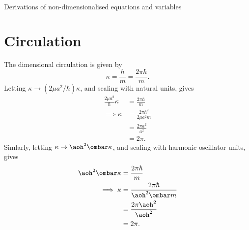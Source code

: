 \begin{chapter}{\label{cha:nondim}Derivations of non-dimensionalised equations
and variables}
  \section{Circulation}
  The dimensional circulation is given by
  \begin{equation*}
    \kappa = \frac{h}{m} = \frac{2\pi\hbar}{m}.
  \end{equation*}
  Letting $\kappa \to (2\mu a^{2}/\hbar)\kappa$, and scaling with natural
  units, gives
  \begin{equation*}
    \begin{aligned}
      \frac{2\mu a^{2}}{\hbar} \kappa &= \frac{2\pi \hbar}{m} \\
      \implies \kappa &= \frac{2\pi \hbar^{2}}{2\mu a^{2} m} \\
      &= \frac{2\pi a^{2}}{a^{2}} \\
      &= 2\pi.
    \end{aligned}
  \end{equation*}
  Simlarly, letting $\kappa \to \aoh^{2}\ombar\kappa$, and scaling with
  harmonic oscillator units, gives
  \begin{equation*}
    \begin{aligned}
      \aoh^{2} \ombar \kappa &= \frac{2\pi \hbar}{m} \\
      \implies \kappa &= \frac{2\pi \hbar}{\aoh^{2} \ombar m} \\
      &= \frac{2\pi \aoh^{2}}{\aoh^{2}} \\
      &= 2\pi.
    \end{aligned}
  \end{equation*}
  \clearpage
\end{chapter}
